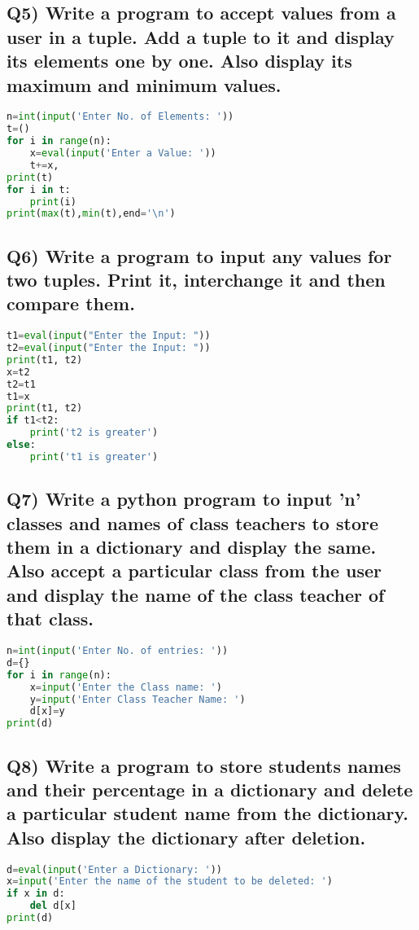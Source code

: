 \documentclass{article}
\begin{document}
\subsection*{Q5) Write a program to accept values from a user in a tuple. Add a tuple to it and display its elements one by one. Also display its maximum and minimum values.}
\begin{lstlisting}[language=Python]
n=int(input('Enter No. of Elements: '))
t=()
for i in range(n):
    x=eval(input('Enter a Value: '))
    t+=x,
print(t)
for i in t:
    print(i)
print(max(t),min(t),end='\n')
\end{lstlisting}

\subsection*{Q6) Write a program to input any values for two tuples. Print it, interchange it and then compare them.}
\begin{lstlisting}[language=Python]
t1=eval(input("Enter the Input: "))
t2=eval(input("Enter the Input: "))
print(t1, t2)
x=t2
t2=t1
t1=x
print(t1, t2)
if t1<t2:
    print('t2 is greater')
else:
    print('t1 is greater')
\end{lstlisting}

\subsection*{Q7) Write a python program to input 'n' classes and names of class teachers to store them in a dictionary and display the same. Also accept a particular class from the user and display the name of the class teacher of that class.}
\begin{lstlisting}[language=Python]
n=int(input('Enter No. of entries: '))
d={}
for i in range(n):
    x=input('Enter the Class name: ')
    y=input('Enter Class Teacher Name: ')
    d[x]=y
print(d)
\end{lstlisting}

\subsection*{Q8) Write a program to store students names and their percentage in a dictionary and delete a particular student name from the dictionary. Also display the dictionary after deletion.}
\begin{lstlisting}[language=Python]
d=eval(input('Enter a Dictionary: '))
x=input('Enter the name of the student to be deleted: ')
if x in d:
    del d[x]
print(d)
\end{lstlisting}
\end{document}
